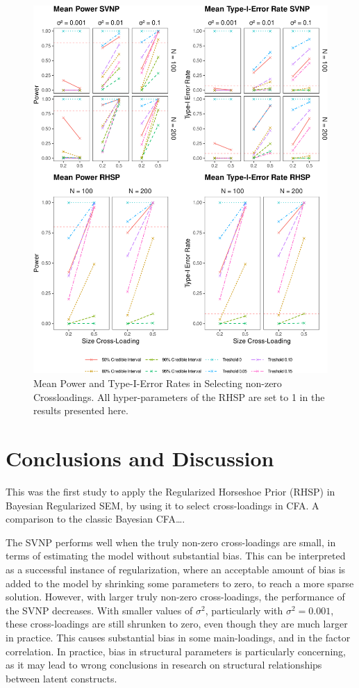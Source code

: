 \documentclass[
  man, donotrepeattitle,floatsintext]{apa6}
\begin{document}
\begin{figure}
\centering
\includegraphics{JMBKoch_thesis_files/figure-latex/unnamed-chunk-5-1.pdf}
\caption{\label{fig:unnamed-chunk-5}Mean Power and Type-I-Error Rates in Selecting non-zero Crossloadings. All hyper-parameters of the RHSP are set to 1 in the results presented here.}
\end{figure}

\hypertarget{conclusions-and-discussion}{%
\section{Conclusions and Discussion}\label{conclusions-and-discussion}}

This was the first study to apply the Regularized Horseshoe Prior (RHSP) in Bayesian Regularized SEM, by using it to select cross-loadings in CFA. A comparison to the classic Bayesian CFA\ldots.

The SVNP performs well when the truly non-zero cross-loadings are small, in terms of estimating the model without substantial bias. This can be interpreted as a successful instance of regularization, where an acceptable amount of bias is added to the model by shrinking some parameters to zero, to reach a more sparse solution. However, with larger truly non-zero cross-loadings, the performance of the SVNP decreases. With smaller values of \(\sigma^2\), particularly with \(\sigma^2 = 0.001\), these cross-loadings are still shrunken to zero, even though they are much larger in practice. This causes substantial bias in some main-loadings, and in the factor correlation. In practice, bias in structural parameters is particularly concerning, as it may lead to wrong conclusions in research on structural relationships between latent constructs.
\end{document}
